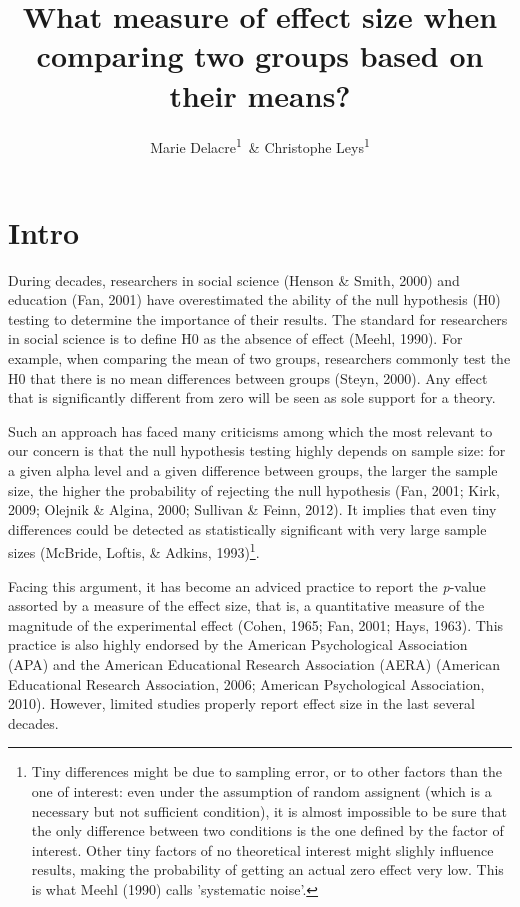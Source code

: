 \documentclass[
  man,floatsintext]{apa6}
\affiliation{
\vspace{0.5cm}
\textsuperscript{1} Université Libre de Bruxelles, Service of Analysis of the Data (SAD), Bruxelles, Belgium}
\title{What measure of effect size when comparing two groups based on their means?}
\author{Marie Delacre\textsuperscript{1}~\& Christophe Leys\textsuperscript{1}}
\date{}
\begin{document}
\maketitle

\hypertarget{intro}{%
\section{Intro}\label{intro}}

During decades, researchers in social science (Henson \& Smith, 2000) and education (Fan, 2001) have overestimated the ability of the null hypothesis (H0) testing to determine the importance of their results. The standard for researchers in social science is to define H0 as the absence of effect (Meehl, 1990). For example, when comparing the mean of two groups, researchers commonly test the H0 that there is no mean differences between groups (Steyn, 2000). Any effect that is significantly different from zero will be seen as sole support for a theory.

Such an approach has faced many criticisms among which the most relevant to our concern is that the null hypothesis testing highly depends on sample size: for a given alpha level and a given difference between groups, the larger the sample size, the higher the probability of rejecting the null hypothesis (Fan, 2001; Kirk, 2009; Olejnik \& Algina, 2000; Sullivan \& Feinn, 2012). It implies that even tiny differences could be detected as statistically significant with very large sample sizes (McBride, Loftis, \& Adkins, 1993)\footnote{Tiny differences might be due to sampling error, or to other factors than the one of interest: even under the assumption of random assignent (which is a necessary but not sufficient condition), it is almost impossible to be sure that the only difference between two conditions is the one defined by the factor of interest. Other tiny factors of no theoretical interest might slighly influence results, making the probability of getting an actual zero effect very low. This is what Meehl (1990) calls 'systematic noise'.}.

Facing this argument, it has become an adviced practice to report the \emph{p}-value assorted by a measure of the effect size, that is, a quantitative measure of the magnitude of the experimental effect (Cohen, 1965; Fan, 2001; Hays, 1963). This practice is also highly endorsed by the American Psychological Association (APA) and the American Educational Research Association (AERA) (American Educational Research Association, 2006; American Psychological Association, 2010). However, limited studies properly report effect size in the last several decades.
\end{document}
